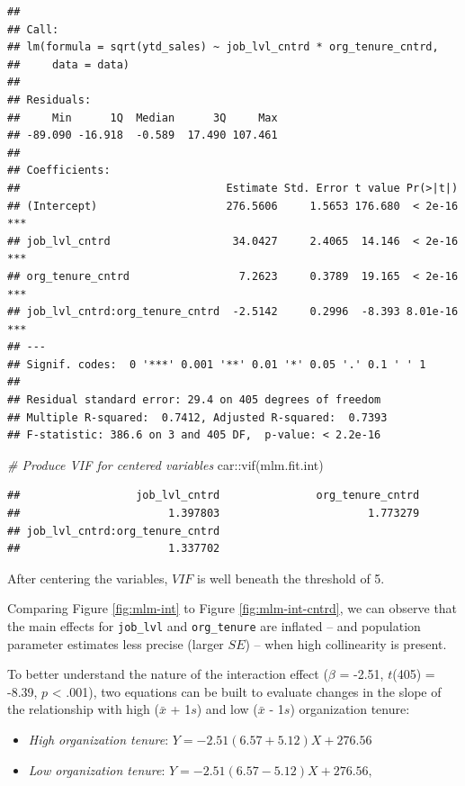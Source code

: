 \documentclass[
]{book}
\newenvironment{Shaded}{\begin{snugshade}}{\end{snugshade}}
\newcommand{\CommentTok}[1]{\textcolor[rgb]{0.56,0.35,0.01}{\textit{#1}}}
\newcommand{\FunctionTok}[1]{\textcolor[rgb]{0.00,0.00,0.00}{#1}}
\newcommand{\NormalTok}[1]{#1}
\newcommand{\SpecialCharTok}[1]{\textcolor[rgb]{0.00,0.00,0.00}{#1}}
\providecommand{\tightlist}{%
  \setlength{\itemsep}{0pt}\setlength{\parskip}{0pt}}
\begin{document}
\begin{verbatim}
## 
## Call:
## lm(formula = sqrt(ytd_sales) ~ job_lvl_cntrd * org_tenure_cntrd, 
##     data = data)
## 
## Residuals:
##     Min      1Q  Median      3Q     Max 
## -89.090 -16.918  -0.589  17.490 107.461 
## 
## Coefficients:
##                                Estimate Std. Error t value Pr(>|t|)    
## (Intercept)                    276.5606     1.5653 176.680  < 2e-16 ***
## job_lvl_cntrd                   34.0427     2.4065  14.146  < 2e-16 ***
## org_tenure_cntrd                 7.2623     0.3789  19.165  < 2e-16 ***
## job_lvl_cntrd:org_tenure_cntrd  -2.5142     0.2996  -8.393 8.01e-16 ***
## ---
## Signif. codes:  0 '***' 0.001 '**' 0.01 '*' 0.05 '.' 0.1 ' ' 1
## 
## Residual standard error: 29.4 on 405 degrees of freedom
## Multiple R-squared:  0.7412, Adjusted R-squared:  0.7393 
## F-statistic: 386.6 on 3 and 405 DF,  p-value: < 2.2e-16
\end{verbatim}

\begin{Shaded}
\begin{Highlighting}[]
\CommentTok{\# Produce VIF for centered variables}
\NormalTok{car}\SpecialCharTok{::}\FunctionTok{vif}\NormalTok{(mlm.fit.int)}
\end{Highlighting}
\end{Shaded}

\begin{verbatim}
##                  job_lvl_cntrd               org_tenure_cntrd 
##                       1.397803                       1.773279 
## job_lvl_cntrd:org_tenure_cntrd 
##                       1.337702
\end{verbatim}

After centering the variables, \(VIF\) is well beneath the threshold of 5.

Comparing Figure \ref{fig:mlm-int} to Figure \ref{fig:mlm-int-cntrd}, we can observe that the main effects for \texttt{job\_lvl} and \texttt{org\_tenure} are inflated -- and population parameter estimates less precise (larger \(SE\)) -- when high collinearity is present.

To better understand the nature of the interaction effect (\(\beta\) = -2.51, \(t\)(405) = -8.39, \(p\) \textless{} .001), two equations can be built to evaluate changes in the slope of the relationship with high (\(\bar{x}\) + 1\(s\)) and low (\(\bar{x}\) - 1\(s\)) organization tenure:

\begin{itemize}
\tightlist
\item
  \emph{High organization tenure}: \(Y = -2.51 (6.57 + 5.12)X + 276.56\)
\item
  \emph{Low organization tenure}: \(Y = -2.51 (6.57 - 5.12)X + 276.56,\)
\end{itemize}
\end{document}
